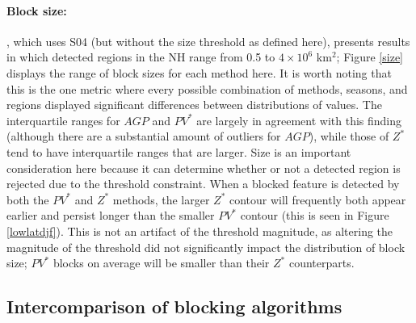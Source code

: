 \documentclass[smallextended]{svjour3}       %
\numberwithin{equation}{section}
\begin{document}


\paragraph{Block size:} \cite{croci-maspoli_multifaceted_2007}, which uses S04 (but without the size threshold as defined here), presents results in which detected regions in the NH range from 0.5 to $4\times 10^6$ km$^2$; Figure \ref{size} displays the range of block sizes for each method here. It is worth noting that this is the one metric where every possible combination of methods, seasons, and regions displayed significant differences between distributions of values. The interquartile ranges for $AGP$ and $PV^*$ are largely in agreement with this finding (although there are a substantial amount of outliers for $AGP$), while those of $Z^*$ tend to have interquartile ranges that are larger. Size is an important consideration here because it can determine whether or not a detected region is rejected due to the threshold constraint. When a blocked feature is detected by both the $PV^*$ and $Z^*$ methods, the larger $Z^*$ contour will frequently both appear earlier and persist longer than the smaller $PV^*$ contour (this is seen in Figure \ref{lowlatdjf}). This is not an artifact of the threshold magnitude, as altering the magnitude of the threshold did not significantly impact the distribution of block size; $PV^*$ blocks on average will be smaller than their $Z^*$ counterparts.

\subsection{Intercomparison of blocking algorithms}\label{intercompare}
\end{document}
